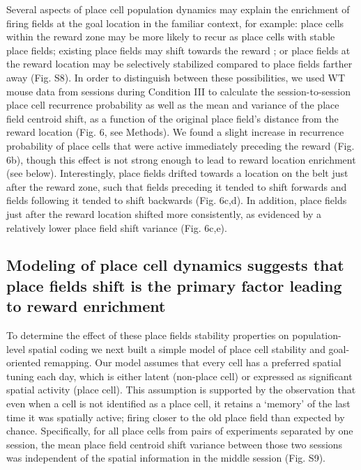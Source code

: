 Several aspects of place cell population dynamics may explain the enrichment of firing fields at the goal location in the familiar context, for example: place cells within the reward zone may be more likely to recur as place cells with stable place fields; existing place fields may shift towards the reward \citep{Lee2006a}; or place fields at the reward location may be selectively stabilized compared to place fields farther away (Fig. S8).  In order to distinguish between these possibilities, we used WT mouse data from sessions during Condition III to calculate the session-to-session place cell recurrence probability as well as the mean and variance of the place field centroid shift, as a function of the original place field’s distance from the reward location (Fig. 6, see Methods).  We found a slight increase in recurrence probability of place cells that were active immediately preceding the reward (Fig. 6b), though this effect is not strong enough to lead to reward location enrichment (see below). Interestingly, place fields drifted towards a location on the belt just after the reward zone, such that fields preceding it tended to shift forwards and fields following it tended to shift backwards (Fig. 6c,d). In addition, place fields just after the reward location shifted more consistently, as evidenced by a relatively lower place field shift variance (Fig. 6c,e). 

\subsection{Modeling of place cell dynamics suggests that place fields shift is the primary factor leading to reward enrichment}

To determine the effect of these place fields stability properties on population-level spatial coding we next built a simple model of place cell stability and goal-oriented remapping. Our model assumes that every cell has a preferred spatial tuning each day, which is either latent (non-place cell) or expressed as significant spatial activity (place cell). This assumption is supported by the observation that even when a cell is not identified as a place cell, it retains a ‘memory’ of the last time it was spatially active; firing closer to the old place field than expected by chance. Specifically, for all place cells from pairs of experiments separated by one session, the mean place field centroid shift variance between those two sessions was independent of the spatial information in the middle session (Fig. S9).

